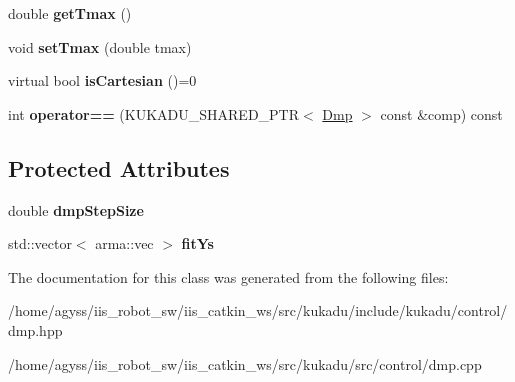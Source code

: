 \begin{DoxyCompactItemize}
\item 
double {\bfseries get\+Tmax} ()\hypertarget{classkukadu_1_1Dmp_aa7423b1cd8096790cc6162e7ecfb604b}{}\label{classkukadu_1_1Dmp_aa7423b1cd8096790cc6162e7ecfb604b}

\item 
void {\bfseries set\+Tmax} (double tmax)\hypertarget{classkukadu_1_1Dmp_a90ba745176c444fb74bfd24722ee8f60}{}\label{classkukadu_1_1Dmp_a90ba745176c444fb74bfd24722ee8f60}

\item 
virtual bool {\bfseries is\+Cartesian} ()=0\hypertarget{classkukadu_1_1Dmp_ac64f37f77911ba0d6e67ea4041601dd8}{}\label{classkukadu_1_1Dmp_ac64f37f77911ba0d6e67ea4041601dd8}

\item 
int {\bfseries operator==} (K\+U\+K\+A\+D\+U\+\_\+\+S\+H\+A\+R\+E\+D\+\_\+\+P\+TR$<$ \hyperlink{classkukadu_1_1Dmp}{Dmp} $>$ const \&comp) const \hypertarget{classkukadu_1_1Dmp_ad944a1f4b2e1857c390f3ab42d64d59b}{}\label{classkukadu_1_1Dmp_ad944a1f4b2e1857c390f3ab42d64d59b}

\end{DoxyCompactItemize}
\subsection*{Protected Attributes}
\begin{DoxyCompactItemize}
\item 
double {\bfseries dmp\+Step\+Size}\hypertarget{classkukadu_1_1Dmp_af0966b32d5f703b6c59a24332f994715}{}\label{classkukadu_1_1Dmp_af0966b32d5f703b6c59a24332f994715}

\item 
std\+::vector$<$ arma\+::vec $>$ {\bfseries fit\+Ys}\hypertarget{classkukadu_1_1Dmp_a1f5e7194bf55d600d9eb1e7447ed552d}{}\label{classkukadu_1_1Dmp_a1f5e7194bf55d600d9eb1e7447ed552d}

\end{DoxyCompactItemize}


The documentation for this class was generated from the following files\+:\begin{DoxyCompactItemize}
\item 
/home/agyss/iis\+\_\+robot\+\_\+sw/iis\+\_\+catkin\+\_\+ws/src/kukadu/include/kukadu/control/dmp.\+hpp\item 
/home/agyss/iis\+\_\+robot\+\_\+sw/iis\+\_\+catkin\+\_\+ws/src/kukadu/src/control/dmp.\+cpp\end{DoxyCompactItemize}
